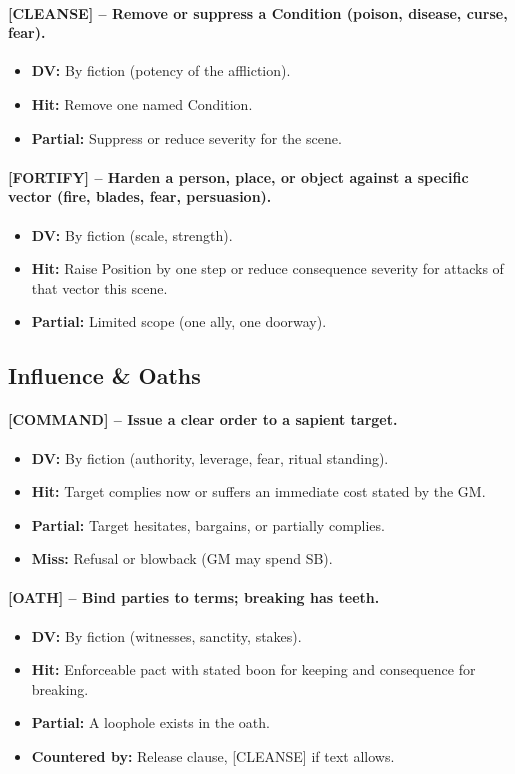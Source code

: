 \paragraph{[CLEANSE] – Remove or suppress a Condition (poison, disease, curse, fear).}
\begin{itemize}
  \item \textbf{DV:} By fiction (potency of the affliction).
  \item \textbf{Hit:} Remove one named Condition.
  \item \textbf{Partial:} Suppress or reduce severity for the scene.
\end{itemize}

\paragraph{[FORTIFY] – Harden a person, place, or object against a specific vector (fire, blades, fear, persuasion).}
\begin{itemize}
  \item \textbf{DV:} By fiction (scale, strength).
  \item \textbf{Hit:} Raise Position by one step or reduce consequence severity for attacks of that vector this scene.
  \item \textbf{Partial:} Limited scope (one ally, one doorway).
\end{itemize}

\subsection{Influence \& Oaths}

\paragraph{[COMMAND] – Issue a clear order to a sapient target.}
\begin{itemize}
  \item \textbf{DV:} By fiction (authority, leverage, fear, ritual standing).
  \item \textbf{Hit:} Target complies now or suffers an immediate cost stated by the GM.
  \item \textbf{Partial:} Target hesitates, bargains, or partially complies.
  \item \textbf{Miss:} Refusal or blowback (GM may spend SB).
\end{itemize}

\paragraph{[OATH] – Bind parties to terms; breaking has teeth.}
\begin{itemize}
  \item \textbf{DV:} By fiction (witnesses, sanctity, stakes).
  \item \textbf{Hit:} Enforceable pact with stated boon for keeping and consequence for breaking.
  \item \textbf{Partial:} A loophole exists in the oath.
  \item \textbf{Countered by:} Release clause, [CLEANSE] if text allows.
\end{itemize}

